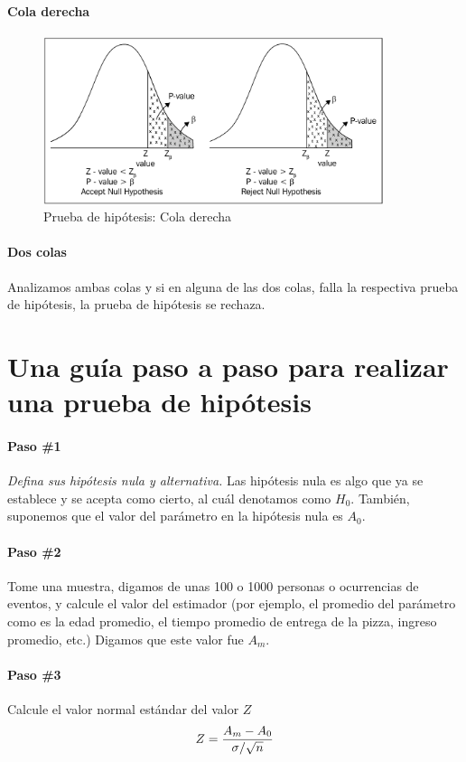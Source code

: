 \paragraph{Cola derecha}
\begin{figure}[h]
 \centering
 \includegraphics[width=10cm,keepaspectratio=true]{./images/kum0404.png}
 \caption{Prueba de hipótesis: Cola derecha}
 \label{kum0403}
\end{figure}


\paragraph{Dos colas}
Analizamos ambas colas y si en alguna de las dos colas, falla la respectiva prueba de hipótesis, la prueba de hipótesis se rechaza.


\section{Una guía paso a paso para realizar una prueba de hipótesis}
\paragraph{Paso \#1}
\emph{Defina sus hipótesis nula y alternativa.} Las hipótesis nula es algo que ya se establece y se acepta como cierto, al cuál denotamos como $H_{0}.$ También, suponemos que el valor del parámetro en la hipótesis nula es $A_{0}.$

\paragraph{Paso \#2}
Tome una muestra, digamos de unas 100 o 1000 personas o ocurrencias de eventos, y calcule el valor del estimador (por ejemplo, el promedio del parámetro como es la edad promedio, el tiempo promedio de entrega de la pizza, ingreso promedio, etc.) Digamos que este valor fue $A_{m}.$

\paragraph{Paso \#3}
Calcule el valor normal estándar del valor $Z$
\begin{align}
 Z=\dfrac{A_{m}-A_{0}}{\sigma/\sqrt{n}}
\end{align}



